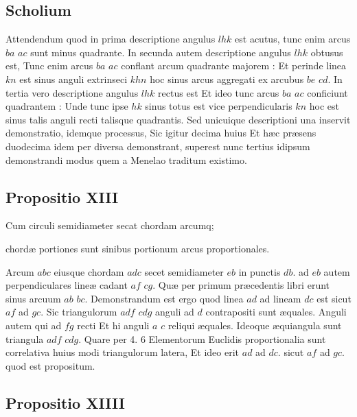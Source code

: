 \documentclass[11pt,a4paper]{article}
\begin{document}
\subsection*{Scholium}

Attendendum quod in prima descriptione angulus $lhk$ est acutus, tunc enim arcus $ba$ $ac$ sunt minus quadrante. In secunda autem descriptione angulus $lhk$ obtusus est, Tunc enim arcus $ba$ $ac$ conflant arcum quadrante majorem : Et perinde linea $kn$ est sinus anguli extrinseci $khn$ hoc sinus arcus aggregati ex arcubus $be$ $cd$. In tertia vero descriptione angulus $lhk$ rectus est Et ideo tunc arcus $ba$ $ac$ conficiunt quadrantem : Unde tunc ipse $hk$ sinus totus est vice perpendicularis $kn$ hoc est sinus talis anguli recti talisque quadrantis. Sed unicuique descriptioni una inservit demonstratio, idemque processus, Sic igitur decima huius Et hæc præsens duodecima idem per diversa demonstrant, superest nunc tertius idipsum demonstrandi modus quem a Menelao traditum existimo.

\subsection*{Propositio XIII}

Cum circuli semidiameter secat chordam arcumq;

chordæ portiones sunt sinibus portionum arcus proportionales.

Arcum $abc$ eiusque chordam $adc$ secet  semidiameter $eb$ in punctis $db$. ad $eb$ autem perpendiculares lineæ cadant $af$ $cg$. Quæ per primum præcedentis libri erunt sinus arcuum $ab$ $bc$. Demonstrandum est ergo quod linea $ad$ ad lineam $dc$ est sicut $af$ ad $gc$. Sic triangulorum $adf$ $cdg$ anguli ad $d$ contrapositi sunt æquales. Anguli autem qui ad $fg$ recti Et hi anguli $a$ $c$ reliqui æquales. Ideoque æquiangula sunt triangula $adf$ $cdg$. Quare per 4. 6 Elementorum Euclidis proportionalia sunt correlativa huius modi triangulorum latera, Et ideo erit $ad$ ad $dc$. sicut $af$ ad $gc$. quod est propositum.

\subsection*{Propositio XIIII}
\end{document}
